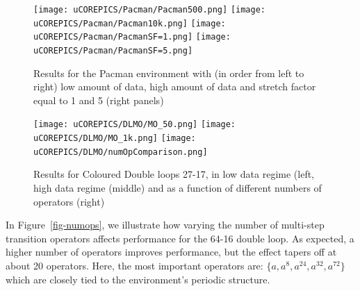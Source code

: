\begin{figure}[ht!]
%
\texttt{[image: uCOREPICS/Pacman/Pacman500.png]}
%
%
\texttt{[image: uCOREPICS/Pacman/Pacman10k.png]}
%
%
%
\texttt{[image: uCOREPICS/Pacman/PacmanSF=1.png]}
%
\texttt{[image: uCOREPICS/Pacman/PacmanSF=5.png]}\vspace*{-4mm}
\caption{Results for the Pacman environment with (in order from left to right) low amount of data, high amount of data and stretch factor equal to 1 and 5 (right panels)\label{fig-pacsf5}\vspace*{-4mm}}
\end{figure}


\begin{figure}[t!]
\centering
\texttt{[image: uCOREPICS/DLMO/MO\_50.png]}
%
\texttt{[image: uCOREPICS/DLMO/MO\_1k.png]}
%
%
%
%
\texttt{[image: uCOREPICS/DLMO/numOpComparison.png]}\vspace*{-4mm}
\caption{Results for Coloured Double loops 27-17, in low data regime (left, high data regime (middle) and as a function of different numbers of operators (right)\label{fig-colnumops}\vspace*{-4mm}}
\end{figure}



In Figure~\ref{fig-numops}, we illustrate how varying the number of multi-step transition operators affects performance for the 64-16 double loop. As expected, a higher number of operators improves performance, but the effect tapers off at about 20 operators. Here, the most important operators are: $\{a,a^{8},a^{24},a^{32},a^{72}\}$ which are closely tied to the environment's periodic structure.

